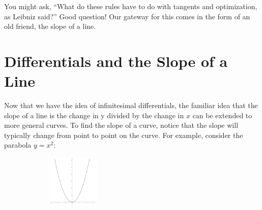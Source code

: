You might ask, ``What do these rules have to do with tangents and
optimization, as Leibniz said?''  Good question!  Our gateway for this
comes in the form of an old friend, the slope of a line. 






\section{Differentials and the Slope of a Line}
\label{sec:diff-slope-line}

Now that we have the idea of infinitesimal differentials, the familiar
idea that the slope of a line is the change in y divided by the change
in $x$ can be extended to more general curves.  To find the slope of a
curve, notice that the slope will typically change from point to point
on the curve.  For example, consider the parabola $y=x^2:$
\begin{figure}
\captionsetup{labelformat=empty}
\centerline{\includegraphics*[height=1in,width=2in]{Figures/parabola1}}
\label{fig:}
\end{figure}

